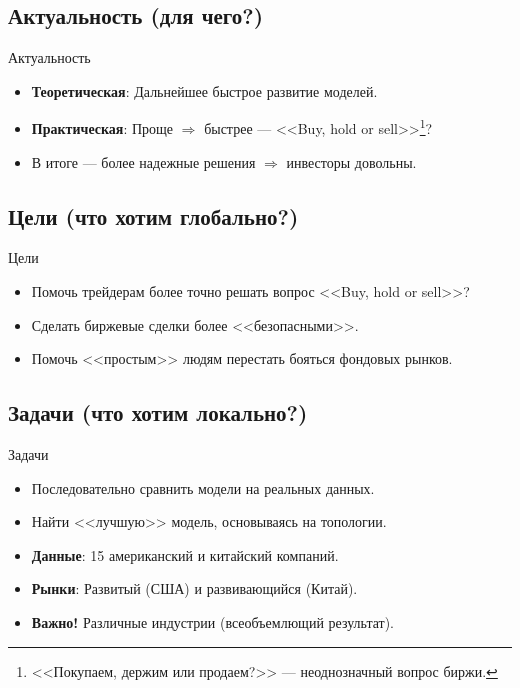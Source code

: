 \documentclass[11pt, aspectratio= 169]{beamer}
\begin{document}
	\subsection{Актуальность (для чего?)}
	\begin{frame}{Актуальность}
		\Large
		\begin{itemize}
			\item \textbf{Теоретическая}: Дальнейшее быстрое развитие моделей.
			\item \textbf{Практическая}: Проще $\Rightarrow$ быстрее --- <<Buy, hold or sell>>\footnote{<<Покупаем, держим или продаем?>> --- неоднозначный вопрос биржи.}?
			\item[] В итоге --- более надежные решения $\Rightarrow$ инвесторы довольны.
		\end{itemize}
	\end{frame}
	
	\subsection{Цели (что хотим глобально?)}
	\begin{frame}{Цели}
		\Large
		\begin{itemize}
			\item Помочь трейдерам более точно решать вопрос <<Buy, hold or sell>>?
			\item Сделать биржевые сделки более <<безопасными>>.
			\item Помочь <<простым>> людям перестать бояться фондовых рынков.
		\end{itemize}
	\end{frame}
	
	\subsection{Задачи (что хотим локально?)}
	\begin{frame}{Задачи}
		\Large
		\begin{itemize}
			\item Последовательно сравнить модели на реальных данных.
			\item Найти <<лучшую>> модель, основываясь на топологии.
			\item \textbf{Данные}: 15 американский и китайский компаний.
			\item[] \textbf{Рынки}: Развитый (США) и развивающийся (Китай).
			\item[] \textbf{Важно!} Различные индустрии (всеобъемлющий результат). 
		\end{itemize}
	\end{frame}
	
\end{document}
